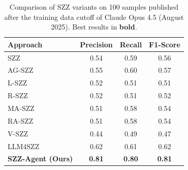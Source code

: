 \begin{table}[htbp]
\centering
\caption{Comparison of SZZ variants on 100 samples published after the training data cutoff of Claude Opus 4.5 (August 2025). Best results in \textbf{bold}.}
\label{tab:results_leakage}
\begin{tabular}{lccc}
\toprule
\textbf{Approach} & \textbf{Precision} & \textbf{Recall} & \textbf{F1-Score} \\
\midrule
SZZ & 0.54 & 0.59 & 0.56 \\
AG-SZZ & 0.55 & 0.60 & 0.57 \\
L-SZZ & 0.52 & 0.51 & 0.51 \\
R-SZZ & 0.52 & 0.51 & 0.52 \\
MA-SZZ & 0.51 & 0.58 & 0.54 \\
RA-SZZ & 0.51 & 0.58 & 0.54 \\
V-SZZ & 0.44 & 0.49 & 0.47 \\
LLM4SZZ & 0.62 & 0.61 & 0.62 \\
\midrule
\rowcolor{gray!20} \textbf{SZZ-Agent (Ours)} & \textbf{0.81} & \textbf{0.80} & \textbf{0.81} \\
\bottomrule
\end{tabular}
\end{table}
